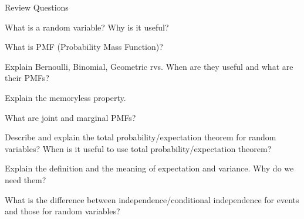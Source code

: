 \begin{frame}{Review Questions}


\plitemsep 0.03in

\bce[1)]
\item What is a random variable? Why is it useful?

\item What is PMF (Probability Mass Function)?

\item Explain Bernoulli, Binomial, Geometric rvs.
  When are they useful and what are their PMFs?

\item Explain the memoryless property.   

\item What are joint and marginal PMFs?

\item Describe and explain the total probability/expectation theorem
  for random variables? When is it useful to use total probability/expectation theorem?

\item Explain the definition and the meaning of expectation and
  variance. Why do we need them?

\item What is the difference between independence/conditional
  independence for events and those for random variables?

  \ece
\end{frame}




